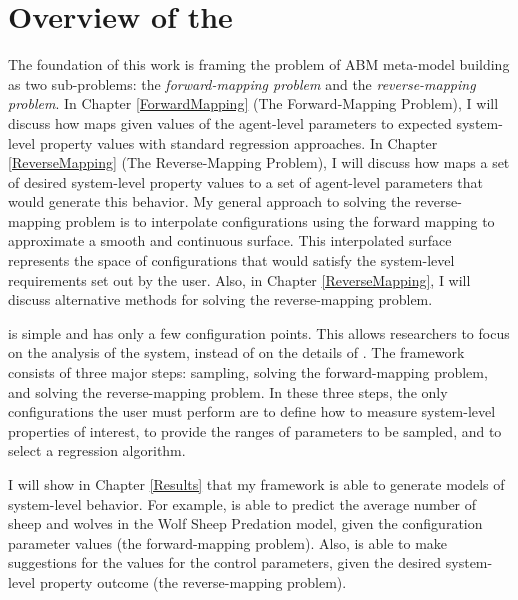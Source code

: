 \section{Overview of the \framework}


The foundation of this work is framing the problem of ABM meta-model building as two sub-problems: the \textit{forward-mapping problem} and the \textit{reverse-mapping problem}.
In Chapter \ref{ForwardMapping} (The Forward-Mapping Problem), I will discuss how \fw maps given values of the agent-level parameters to expected system-level property values with standard regression approaches.
In Chapter \ref{ReverseMapping} (The Reverse-Mapping Problem), I will discuss how \fw maps a set of desired system-level property values to a set of agent-level parameters that would generate this behavior.
My general approach to solving the reverse-mapping problem is to interpolate configurations using the forward mapping to approximate a smooth and continuous surface.
This interpolated surface represents the space of configurations that would satisfy the system-level requirements set out by the user.
Also, in Chapter \ref{ReverseMapping}, I will discuss alternative methods for solving the reverse-mapping problem.


\fw is simple and has only a few configuration points.
This allows researchers to focus on the analysis of the system, instead of on the details of \fw.
The framework consists of three major steps: sampling, solving the forward-mapping problem, and solving the reverse-mapping problem.
In these three steps, the only configurations the user must perform are to define how to measure system-level properties of interest, to provide the ranges of parameters to be sampled, and to select a regression algorithm.

I will show in Chapter \ref{Results} that my framework is able to generate models of system-level behavior.
For example, \fw is able to predict the average number of sheep and wolves in the Wolf Sheep Predation model, given the configuration parameter values (the forward-mapping problem).
Also, \fw is able to make suggestions for the values for the control parameters, given the desired system-level property outcome (the reverse-mapping problem).

